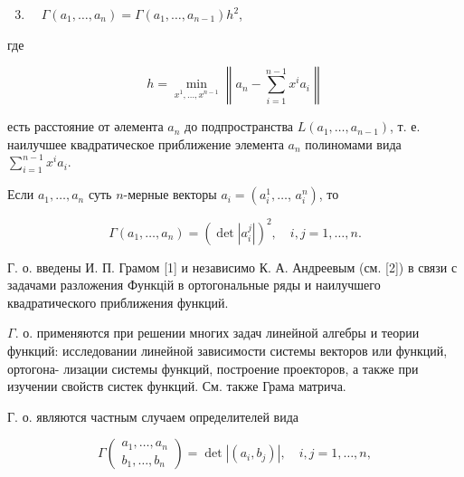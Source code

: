 \documentclass[10pt]{article}
\begin{document}
\begin{enumerate}

  \setcounter{enumi}{2}

  \item $\quad \Gamma\left(a_{1}, \ldots, a_{n}\right)=\Gamma\left(a_{1}, \ldots, a_{n-1}\right) h^{2}$,

\end{enumerate}



где



\[

h=\min _{x^{1}, \ldots, x^{n-1}}\left\|a_{n}-\sum_{i=1}^{n-1} x^{i} a_{i}\right\|

\]



есть расстояние от әлемента $a_{n}$ до подпространства $L\left(a_{1}, \ldots, a_{n-1}\right)$, т. е. наилучшее квадратическое приближение элемента $a_{n}$ полиномами вида $\sum_{i=1}^{n-1} x^{i} a_{i}$.



Если $a_{1}, \ldots, a_{n}$ суть $n$-мерные векторы $a_{i}=\left(a_{i}^{1}, \ldots\right.$, $\left.a_{i}^{n}\right)$, то



\[

\Gamma\left(a_{1}, \ldots, a_{n}\right)=\left(\operatorname{det}\left|a_{i}^{j}\right|\right)^{2}, \quad i, j=1, \ldots, n .

\]



Г. о. введены И. П. Грамом [1] и независимо К. А. Андреевым (см. [2]) в связи с задачами разложения Функцій в ортогональные ряды и наилучшего квадратического приближения функций.



$\Gamma$. о. применяются при решении многих задач линейной алгебры и теории функций: исследовании линейной зависимости системы векторов или функций, ортогона- лизации системы функций, построение проекторов, а также при изучении свойств систек функций. См. также Грама матрича.



Г. о. являются частным случаем определителей вида



\[

\Gamma\left(\begin{array}{l}

a_{1}, \ldots, a_{n} \\

b_{1}, \ldots, b_{n}

\end{array}\right)=\operatorname{det}\left|\left(a_{i}, b_{j}\right)\right|, \quad i, j=1, \ldots, n,

\]
\end{document}
